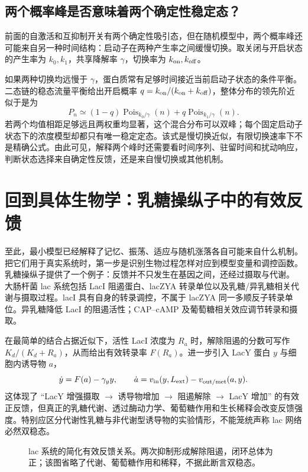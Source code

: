 \documentclass[11pt,a4paper,UTF8,fontset=fandol]{ctexart}
\begin{document}
\subsection{两个概率峰是否意味着两个确定性稳定态？}
前面的自激活和互抑制开关有两个确定性吸引态，但在随机模型中，两个概率峰还可能来自另一种时间结构：启动子在两种产生率之间缓慢切换。取关闭与开启状态的产生率为 $k_0,k_1$，共享降解率 $\gamma$，切换率为 $k_{\rm on},k_{\rm off}$。

如果两种切换均远慢于 $\gamma$，蛋白质常有足够时间接近当前启动子状态的条件平衡。二态链的稳态流量平衡给出开启概率 $q=k_{\rm on}/(k_{\rm on}+k_{\rm off})$，整体分布的领先阶近似于是为
\[
P_n\simeq(1-q)\operatorname{Pois}_{k_0/\gamma}(n)+q\operatorname{Pois}_{k_1/\gamma}(n).
\]
若两个均值相距足够远且两权重均显著，这个混合分布可以双峰；每个固定启动子状态下的浓度模型却都只有唯一稳定定态。该式是慢切换近似，有限切换速率下不是精确公式。由此可见，解释两个峰时还需要看时间序列、驻留时间和扰动响应，判断状态选择来自确定性反馈，还是来自慢切换或其他机制。

\section{回到具体生物学：乳糖操纵子中的有效反馈}
至此，最小模型已经解释了记忆、振荡、适应与随机涨落各自可能来自什么机制。把它们用于真实系统时，第一步是识别生物过程怎样对应到模型变量和调控函数。乳糖操纵子提供了一个例子：反馈并不只发生在基因之间，还经过摄取与代谢。
大肠杆菌 lac 系统包括 LacI 阻遏蛋白、lacZYA 转录单位以及乳糖/异乳糖相关代谢与摄取过程。lacI 具有自身的转录调控，不属于 lacZYA 同一多顺反子转录单位。异乳糖降低 LacI 的阻遏活性；CAP--cAMP 及葡萄糖相关效应调节转录和摄取。

在最简单的结合占据近似下，活性 LacI 浓度为 $R_a$ 时，解除阻遏的分数可写作 $K_d/(K_d+R_a)$，从而给出有效转录率 $F(R_a)$。进一步引入 LacY 蛋白 $y$ 与细胞内诱导物 $a$，
\begin{equation}\dot y=F(a)-\gamma_y y,\qquad\dot a=v_{\rm in}(y,L_{\rm ext})-v_{\rm out/met}(a,y).\end{equation}
这体现了 ``LacY 增强摄取 $\to$ 诱导物增加 $\to$ 阻遏解除 $\to$ LacY 增加'' 的有效正反馈，但真正的乳糖代谢、透过酶动力学、葡萄糖作用和生长稀释会改变反馈强度。特别应区分代谢性乳糖与非代谢型诱导物的实验情形，不能笼统声称 lac 网络必然双稳态。

\begin{figure}[H]\centering
{}
\caption{lac 系统的简化有效反馈关系。两次抑制形成解除阻遏，闭环总体为正；该图省略了代谢、葡萄糖作用和稀释，不据此断言双稳态。}
\end{figure}
\end{document}
